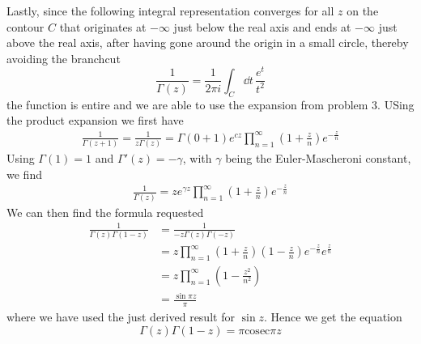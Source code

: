 \documentclass[a4paper,12pt]{article}
\begin{document}
Lastly, since the following integral representation converges for all $z$ on the contour $C$ that originates at $-\infty$ just below the real axis and ends at $-\infty$ just above the real axis, after having gone around the origin in a small circle, thereby avoiding the branchcut
\begin{equation}
\frac{1}{\Gamma(z)}=\frac{1}{2\pi i}\int_C\dd t\, \frac{e^t}{t^2}
\end{equation}
the function is entire and we are able to use the expansion from problem 3. USing the product expansion we first have
\begin{equation}
\begin{aligned}
\frac{1}{\Gamma(z+1)}=\frac{1}{z\Gamma(z)}=\Gamma(0+1)e^{cz}\prod_{n=1}^{\infty}\left(1+\frac{z}{n}\right)e^{-\frac{z}{n}}
\end{aligned}
\end{equation}
Using $\Gamma(1)=1$ and $\Gamma'(z)=-\gamma$, with $\gamma $ being the Euler-Mascheroni constant, we find
\begin{equation}
	\begin{aligned}
\frac{1}{\Gamma(z)}=ze^{\gamma z}\prod_{n=1}^{\infty}\left(1+\frac{z}{n}\right)e^{-\frac{z}{n}}
	\end{aligned}
\end{equation}
We can then find the formula requested
\begin{equation}
\begin{aligned}
\frac{1}{\Gamma(z)\Gamma(1-z)}&=
\frac{1}{-z\Gamma(z)\Gamma(-z)}\\
&=z\prod_{n=1}^{\infty}\left(1+\frac{z}{n}\right)\left(1-\frac{z}{n}\right)e^{-\frac{z}{n}}e^{\frac{z}{n}}\\
&=z\prod_{n=1}^{\infty}\left(1-\frac{z^2}{n^2}\right)\\
&=\frac{\sin \pi z}{\pi}
\end{aligned}
\end{equation}
where we have used the just derived result for $\sin z$. Hence we get the equation
\begin{equation}
\Gamma(z)\Gamma(1-z)=\pi\text{cosec} \pi z
\end{equation}
\end{document}
